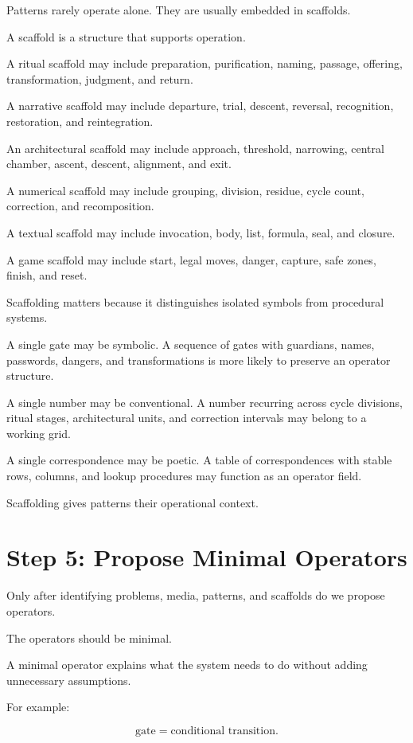 \documentclass[11pt]{book}
\begin{document}
Patterns rarely operate alone. They are usually embedded in scaffolds.

A scaffold is a structure that supports operation.

A ritual scaffold may include preparation, purification, naming, passage, offering, transformation, judgment, and return.

A narrative scaffold may include departure, trial, descent, reversal, recognition, restoration, and reintegration.

An architectural scaffold may include approach, threshold, narrowing, central chamber, ascent, descent, alignment, and exit.

A numerical scaffold may include grouping, division, residue, cycle count, correction, and recomposition.

A textual scaffold may include invocation, body, list, formula, seal, and closure.

A game scaffold may include start, legal moves, danger, capture, safe zones, finish, and reset.

Scaffolding matters because it distinguishes isolated symbols from procedural systems.

A single gate may be symbolic. A sequence of gates with guardians, names, passwords, dangers, and transformations is more likely to preserve an operator structure.

A single number may be conventional. A number recurring across cycle divisions, ritual stages, architectural units, and correction intervals may belong to a working grid.

A single correspondence may be poetic. A table of correspondences with stable rows, columns, and lookup procedures may function as an operator field.

Scaffolding gives patterns their operational context.

\section{Step 5: Propose Minimal Operators}

Only after identifying problems, media, patterns, and scaffolds do we propose operators.

The operators should be minimal.

A minimal operator explains what the system needs to do without adding unnecessary assumptions.

For example:

\[
\text{gate} = \text{conditional transition}.
\]
\end{document}
